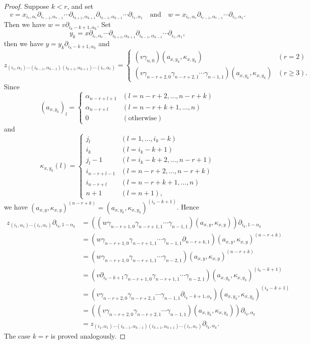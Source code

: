 \documentclass[oneside, 12pt]{amsart}
\numberwithin{equation}{section}
\theoremstyle{plain}
\theoremstyle{definition}
\theoremstyle{remark}
\begin{document}
	\begin{proof}
		Suppose $k<r$, and set
		\[
		v=x_{i_r,\alpha_r}\partial_{i_{r-1},\alpha_{r-1}}\cdots\partial_{i_{k+1},\alpha_{k+1}}\partial_{i_{k-1},\alpha_{k-1}}\cdots\partial_{i_1,\alpha_1}\quad\text{and}\quad w=x_{i_r,\alpha_r}\partial_{i_{r-1},\alpha_{r-1}}\cdots\partial_{i_1,\alpha_1}.
		\]
		Then we have $w=v\partial_{i_k-k+1,\alpha_k}$. Set
		\[
		y_k=x\partial_{i_r,\alpha_r}\cdots\partial_{i_{k+1},\alpha_{k+1}}\partial_{i_{k-1},\alpha_{k-1}}\cdots\partial_{i_1,\alpha_1},
		\]
		then we have $y=y_k\partial_{i_k-k+1,\alpha_k}$ and
		\[
		z_{(i_1,\alpha_1)\cdots(i_{k-1},\alpha_{k-1})(i_{k+1},\alpha_{k+1})\cdots(i_r,\alpha_r)}=\begin{cases}
			(v\gamma_{n,0})(a_{x,y_k},\kappa_{x,y_k})&(r=2)\\
			(v\gamma_{n-r+2,0}\gamma_{n-r+2,1}\cdots\gamma_{n-1,1})(a_{x,y_k},\kappa_{x,y_k})&(r\ge3).
		\end{cases}
		\]
		Since
		\[
		(a_{x,y_k})_l=\begin{cases}
			\alpha_{n-r+l+1}&(l=n-r+2,\ldots,n-r+k)\\
			\alpha_{n-r+l}&(l=n-r+k+1,\ldots,n)\\
			0&(\text{otherwise})
		\end{cases}
		\]
		and
		\[
		\kappa_{x,y_k}(l)=\begin{cases}
			j_l&(l=1,\ldots,i_k-k)\\
			i_k&(l=i_k-k+1)\\
			j_l-1&(l=i_k-k+2,\ldots,n-r+1)\\
			i_{n-r+l-1}&(l=n-r+2,\ldots,n-r+k)\\
			i_{n-r+l}&(l=n-r+k+1,\ldots,n)\\
			n+1&(l=n+1),
		\end{cases}
		\]
		we have $(a_{x,y},\kappa_{x,y})^{(n-r+k)}=(a_{x,y_k},\kappa_{x,y_k})^{(i_k-k+1)}$. Hence
		\begin{align*}
			z_{(i_1,\alpha_1)\cdots(i_r,\alpha_r)}\partial_{i_k,1-\alpha_k}
			&=((w\gamma_{n-r+1,0}\gamma_{n-r+1,1}\cdots\gamma_{n-1,1})(a_{x,y},\kappa_{x,y}))\partial_{i_k,1-\alpha_k}\\
			&=(w\gamma_{n-r+1,0}\gamma_{n-r+1,1}\cdots\gamma_{n-1,1}\partial_{n-r+k,1})(a_{x,y},\kappa_{x,y})^{(n-r+k)}\\
			&=(w\gamma_{n-r+1,0}\gamma_{n-r+1,1}\cdots\gamma_{n-2,1})(a_{x,y},\kappa_{x,y})^{(n-r+k)}\\
			&=(v\partial_{i_k-k+1}\gamma_{n-r+1,0}\gamma_{n-r+1,1}\cdots\gamma_{n-2,1})(a_{x,y_k},\kappa_{x,y_k})^{(i_k-k+1)}\\
			&=(v\gamma_{n-r+2,0}\gamma_{n-r+2,1}\cdots\gamma_{n-1,1}\partial_{i_k-k+1,\alpha_k})(a_{x,y_k},\kappa_{x,y_k})^{(i_k-k+1)}\\
			&=((v\gamma_{n-r+2,0}\gamma_{n-r+2,1}\cdots\gamma_{n-1,1})(a_{x,y_k},\kappa_{x,y_k}))\partial_{i_k,\alpha_k}\\
			&=z_{(i_1,\alpha_1)\cdots(i_{k-1},\alpha_{k-1})(i_{k+1},\alpha_{k+1})\cdots(i_r,\alpha_r)}\partial_{i_k,\alpha_k}.
		\end{align*}
		The case $k=r$ is proved analogously.
	\end{proof}
	
\end{document}
